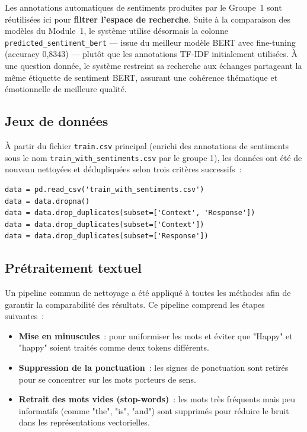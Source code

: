 \documentclass[12pt,a4paper]{report}
\begin{document}
\begin{note}
Les annotations automatiques de sentiments produites par le Groupe~1 sont réutilisées ici pour \textbf{filtrer l'espace de recherche}. Suite à la comparaison des modèles du Module~1, le système utilise désormais la colonne \texttt{predicted\_sentiment\_bert} — issue du meilleur modèle BERT avec fine-tuning (accuracy 0,8343) — plutôt que les annotations TF-IDF initialement utilisées. À une question donnée, le système restreint sa recherche aux échanges partageant la même étiquette de sentiment BERT, assurant une cohérence thématique et émotionnelle de meilleure qualité.
\end{note}

\subsection{Jeux de données}

À partir du fichier \texttt{train.csv} principal (enrichi des annotations de sentiments sous le nom \texttt{train\_with\_sentiments.csv} par le groupe 1), les données ont été de nouveau nettoyées et dédupliquées selon trois critères successifs~:

\begin{lstlisting}
data = pd.read_csv('train_with_sentiments.csv')
data = data.dropna()
data = data.drop_duplicates(subset=['Context', 'Response'])
data = data.drop_duplicates(subset=['Context'])
data = data.drop_duplicates(subset=['Response'])
\end{lstlisting}

\subsection{Prétraitement textuel}

Un pipeline commun de nettoyage a été appliqué à toutes les méthodes afin 
de garantir la comparabilité des résultats. 
Ce pipeline comprend les étapes suivantes~:
\begin{itemize}
  \item \textbf{Mise en minuscules}~: pour uniformiser les mots et éviter que "Happy" et "happy" soient traités comme deux tokens différents.
  \item \textbf{Suppression de la ponctuation}~: les signes de ponctuation sont retirés pour se concentrer sur les mots porteurs de sens.
  \item \textbf{Retrait des mots vides (stop-words)}~: les mots très fréquents mais peu informatifs (comme "the", "is", "and") sont supprimés pour réduire le bruit dans les représentations vectorielles.
\end{itemize}
\end{document}
